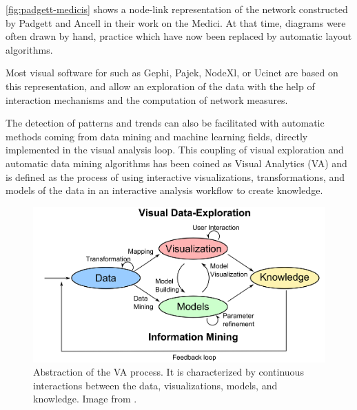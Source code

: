 \autoref{fig:padgett-medicis} shows a node-link representation of the network constructed by Padgett and Ancell in their work on the Medici.
At that time, diagrams were often drawn by hand, practice which have now been replaced by automatic layout algorithms.

Most visual software for \sna such as Gephi, Pajek, NodeXl, or Ucinet are based on this representation, and allow an exploration of the data with the help of interaction mechanisms and the computation of network measures.


The detection of patterns and trends can also be facilitated with automatic methods coming from data mining and machine learning fields, directly implemented in the visual analysis loop.
This coupling of visual exploration and automatic data mining algorithms has been coined as Visual Analytics (VA) and is defined as the process of using interactive visualizations, transformations, and models of the data in an interactive analysis workflow to create knowledge\cite{keimVisualAnalyticsDefinition2008}.

\begin{figure}
    \centering %
    \includegraphics[width=1\textwidth]{static/figures/RelatedWork/Keim-VisualAnalytics.png}
    \caption{Abstraction of the VA process. It is characterized by continuous interactions between the data, visualizations, models, and knowledge. Image from \cite{keimVisualAnalyticsDefinition2008}.}
    \label{fig:keim-va}
\end{figure}

